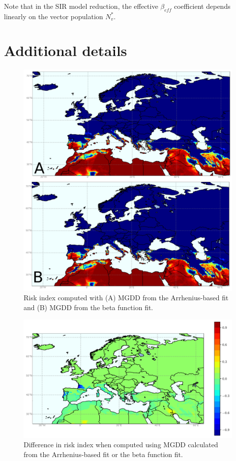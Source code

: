 Note that in the SIR model reduction, the effective $\beta_{eff}$
coefficient depends linearly on the vector population $N_v^*$.

\section{Additional details}

\begin{figure}[H]
    \centering
    \includegraphics[width=\textwidth]{Figures/Risk_risk_beta.png}
    \caption{Risk index computed with (A) MGDD from the Arrhenius-based fit and
        (B) MGDD from the beta function fit.}
    \label{fig:R2} %
\end{figure}

\begin{figure}[H]
    \centering
    \includegraphics[width=\textwidth]{Figures/Diff_risk_beta_minus_risk.png}
    \caption{Difference in risk index when computed using MGDD calculated from
        the Arrhenius-based fit or the beta function fit.}
    \label{fig:R3} %
\end{figure}

